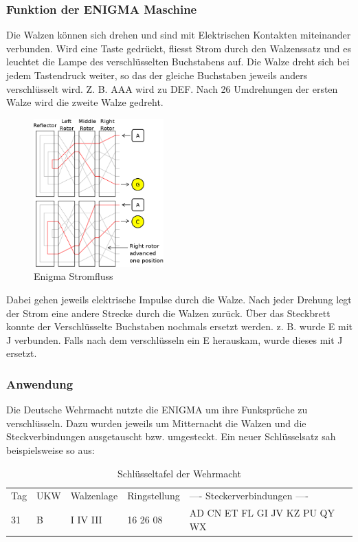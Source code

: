 \subsubsection{Funktion der ENIGMA Maschine}
Die Walzen können sich drehen und sind mit Elektrischen Kontakten miteinander verbunden. Wird eine Taste gedrückt, fliesst Strom durch den Walzenssatz und es leuchtet die Lampe des verschlüsselten Buchstabens auf. Die Walze dreht sich bei jedem Tastendruck weiter, so das der gleiche Buchstaben jeweils anders verschlüsselt wird. Z. B. AAA wird zu DEF. Nach 26 Umdrehungen der ersten Walze wird die zweite Walze gedreht. \\

\begin{figure}[ht]
\begin{center}
\includegraphics[width=5cm]{images/Enigma-action.png}
\caption{Enigma Stromfluss}
\end{center}
\end{figure}

Dabei gehen jeweils elektrische Impulse durch die Walze. Nach jeder Drehung legt der Strom eine andere Strecke durch die Walzen zurück. 
Über das Steckbrett konnte der Verschlüsselte Buchstaben nochmals ersetzt werden. z. B. wurde E mit J verbunden. Falls nach dem verschlüsseln ein E herauskam, wurde dieses mit J ersetzt. 

\subsubsection{Anwendung}
Die Deutsche Wehrmacht nutzte die ENIGMA um ihre Funksprüche zu verschlüsseln. Dazu wurden jeweils um Mitternacht die Walzen und die Steckverbindungen ausgetauscht bzw. umgesteckt. Ein neuer Schlüsselsatz sah beispielsweise so aus:

\begin{table}[ht]
\caption{Schlüsseltafel der Wehrmacht}
\begin{center}
\begin{tabular}{|l|l|l|l|l}
Tag & UKW & Walzenlage & Ringstellung &  ---- Steckerverbindungen ---- \\
 31  &   B   &  I   IV III   &    16 26 08   &  AD CN ET FL GI JV KZ PU QY WX \\
\end{tabular}
\end{center}
\end{table}

